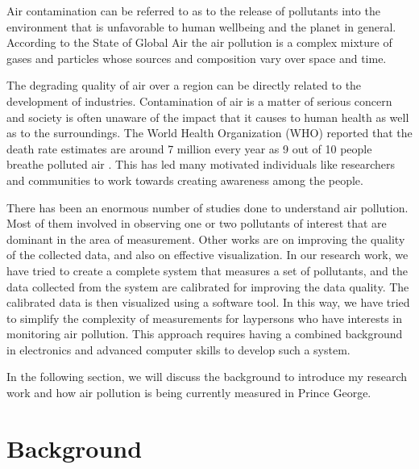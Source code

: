  Air contamination can be referred to as to the release of pollutants into the environment that is unfavorable to human wellbeing and the planet in general. According to the State of Global Air \cite{HealthEffectsInstitute2017}  the air pollution is a complex mixture of gases and particles whose sources and composition vary over space and time. 
 
 
 The degrading quality of air over a region can be directly related to the development of industries. Contamination of air is a matter of serious concern and society is often unaware of the impact that it causes to human health as well as to the surroundings. The World Health Organization (WHO) reported that the death rate estimates are around 7 million every year as 9 out of 10 people breathe polluted air \cite{Wolman1985}. This has led many motivated individuals like researchers and communities to work towards creating awareness among the people.
 
 There has been an enormous number of studies done to understand air pollution. Most of them involved in observing one or two pollutants of interest that are dominant in the area of measurement. Other works are on  improving the quality of the collected data, and also on effective visualization. In our research work, we have tried to create a complete system that measures a set of pollutants, and the data collected from the system are calibrated for improving the data quality. The calibrated data is then visualized using a software tool. In this way, we have tried to simplify the complexity of measurements for laypersons who have interests in monitoring air pollution. This approach requires having a combined background in electronics and advanced computer skills to develop such a system. 
 
 In the following section, we will discuss the background to introduce my research work and how air pollution is being currently measured in Prince George.
 
 



 \section{Background}

